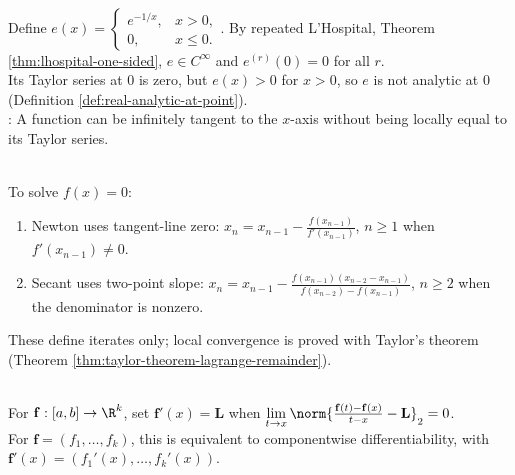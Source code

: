 \begin{example} \label{ex:smooth-flat-nonanalytic-function} \\
Define $e(x)=
\begin{cases}
e^{-1/x},&x>0,\\
0,&x\leq0.
\end{cases}$.
By repeated L'Hospital, Theorem \ref{thm:lhospital-one-sided}, $e\in C^\infty$ and $e^{(r)}(0)=0$ for all $r$.\\
Its Taylor series at $0$ is zero, but $e(x)>0$ for $x>0$, so $e$ is not analytic at $0$ (Definition \ref{def:real-analytic-at-point}).\\
: A function can be infinitely tangent to the $x$-axis without being locally equal to its Taylor series.
\end{example}

\begin{method} \label{meth:newton-and-secant-iterations} \\
To solve $f(x)=0$:
\begin{enumerate}[label=(\roman*)]
\setlength{\itemsep}{0pt}
\item
Newton uses tangent-line zero: $x_n=x_{n-1}-\frac{f(x_{n-1})}{f'(x_{n-1})}$, $n\geq1$ when $f'(x_{n-1})\neq0$.
\item
Secant uses two-point slope: $x_n=x_{n-1}-\frac{f(x_{n-1})(x_{n-2}-x_{n-1})}{f(x_{n-2})-f(x_{n-1})}$, $n\geq2$ when the denominator is nonzero.
\end{enumerate}
These define iterates only; local convergence is proved with Taylor's theorem (Theorem \ref{thm:taylor-theorem-lagrange-remainder}).
\end{method}

\begin{definition} \label{def:vector-valued-derivative-one-variable} \\
For $\mathbf{f}:[a,b]\to\R^k$, set $\mathbf{f}'(x)=\mathbf{L}$ when $\lim\limits_{t\to x}\norm{\frac{\mathbf{f}(t)-\mathbf{f}(x)}{t-x}-\mathbf{L}}_2=0$.\\
For $\mathbf{f}=(f_1,\ldots,f_k)$, this is equivalent to componentwise differentiability, with $\mathbf{f}'(x)=(f_1'(x),\ldots,f_k'(x))$.
\end{definition}

